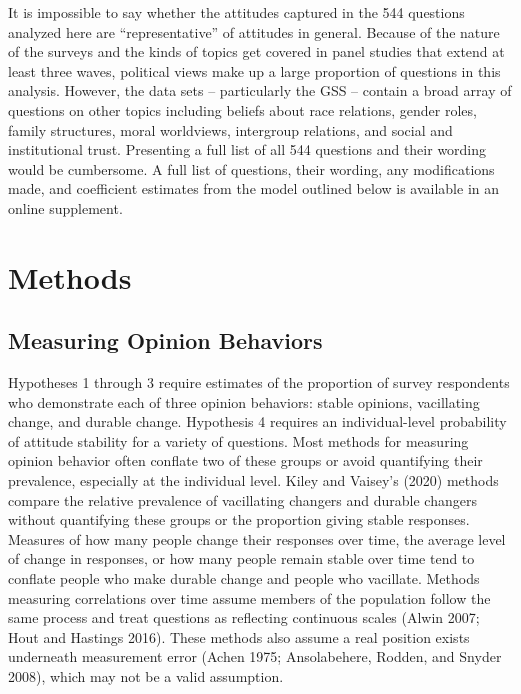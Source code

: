\documentclass[12pt,]{article}
\begin{document}
It is impossible to say whether the attitudes captured in the 544 questions analyzed here are ``representative'' of attitudes in general. Because of the nature of the surveys and the kinds of topics get covered in panel studies that extend at least three waves, political views make up a large proportion of questions in this analysis. However, the data sets -- particularly the GSS -- contain a broad array of questions on other topics including beliefs about race relations, gender roles, family structures, moral worldviews, intergroup relations, and social and institutional trust. Presenting a full list of all 544 questions and their wording would be cumbersome. A full list of questions, their wording, any modifications made, and coefficient estimates from the model outlined below is available in an online supplement.

\hypertarget{methods}{%
\section{Methods}\label{methods}}

\hypertarget{measuring-opinion-behaviors}{%
\subsection{Measuring Opinion Behaviors}\label{measuring-opinion-behaviors}}

Hypotheses 1 through 3 require estimates of the proportion of survey respondents who demonstrate each of three opinion behaviors: stable opinions, vacillating change, and durable change. Hypothesis 4 requires an individual-level probability of attitude stability for a variety of questions. Most methods for measuring opinion behavior often conflate two of these groups or avoid quantifying their prevalence, especially at the individual level. Kiley and Vaisey's (2020) methods compare the relative prevalence of vacillating changers and durable changers without quantifying these groups or the proportion giving stable responses. Measures of how many people change their responses over time, the average level of change in responses, or how many people remain stable over time tend to conflate people who make durable change and people who vacillate. Methods measuring correlations over time assume members of the population follow the same process and treat questions as reflecting continuous scales (Alwin 2007; Hout and Hastings 2016). These methods also assume a real position exists underneath measurement error (Achen 1975; Ansolabehere, Rodden, and Snyder 2008), which may not be a valid assumption.
\end{document}
